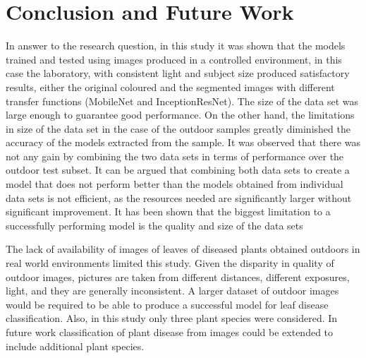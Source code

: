 \documentclass[conference]{IEEEtran}
\begin{document}
\section{Conclusion and Future Work}

In answer to the research question, in this study it was shown that the models trained and tested using images produced in a controlled environment, in this case the laboratory, with consistent light and subject size produced satisfactory results, either the original coloured and the segmented images with different transfer functions (MobileNet and InceptionResNet). The size of the data set was large enough to guarantee good performance. On the other hand, the limitations in size of the data set in the case of the outdoor samples greatly diminished the accuracy of the models extracted from the sample. It was observed that there was not any gain by combining the two data sets in terms of performance over the outdoor test subset. It can be argued that combining both data sets to create a model that does not perform better than the models obtained from individual data sets is not efficient, as the resources needed are significantly larger without significant improvement. It has been shown that the biggest limitation to a successfully performing model is the quality and size of the data sets \

The lack of availability of images of leaves of diseased plants obtained outdoors in real world environments limited this study.  Given the disparity in quality of outdoor images, pictures are taken from different distances, different exposures, light, and they are generally inconsistent. A larger dataset of outdoor images would be required to be able to produce a successful model for leaf disease classification. Also, in this study only three plant species were considered. In future work classification of plant disease from images could be extended to include additional plant species.\
\end{document}
